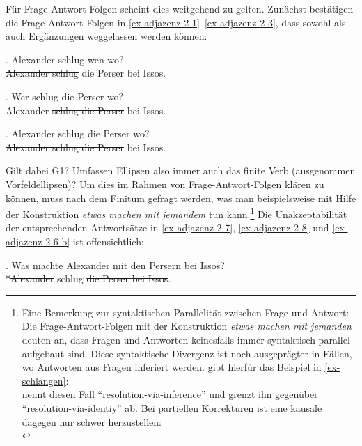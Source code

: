 Für Frage-Antwort-Folgen scheint dies weitgehend zu gelten. Zunächst bestätigen die Fra\-ge-Antwort-Folgen in \ref{ex-adjazenz-2-1}--\ref{ex-adjazenz-2-3}, dass sowohl  als auch Ergänzungen weggelassen werden können: 

\ex. \label{ex-adjazenz-2-1} Alexander schlug wen wo? \\
\sout{Alexander schlug} die Perser bei Issos.

\ex. \label{ex-adjazenz-2-2} Wer schlug die Perser wo? \\
 Alexander \sout{schlug die Perser} bei Issos.

\ex. \label{ex-adjazenz-2-3} Alexander schlug die Perser wo? \\
 \sout{Alexander schlug die Perser} bei Issos.

Gilt dabei G1? Umfassen Ellipsen also immer auch das finite Verb (ausgenommen Vorfeldellipsen)? Um dies im Rahmen von Frage-Antwort-Folgen klären zu können, muss nach dem Finitum gefragt werden, was man beispielsweise mit Hilfe der Konstruktion {\it etwas machen mit jemandem} tun kann.\footnote{Eine Bemerkung zur syntaktischen Parallelität zwischen Frage und Antwort: Die Frage-Antwort-Folgen mit der Konstruktion {\it etwas machen mit jemanden} deuten an, dass Fragen und Antworten keinesfalls immer syntaktisch parallel aufgebaut sind. Diese syntaktische Divergenz ist noch ausgeprägter in Fällen, wo Antworten aus Fragen inferiert werden. \cite{Schlangen:03} gibt hierfür das Beispiel in \ref{ex-schlangen}:\\
\cite{Schlangen:03} nennt diesen Fall "`resolution-via-inference"' und grenzt ihn gegenüber "`resolution-via-identiy"' ab. Bei partiellen Korrekturen ist eine kausale  dagegen nur schwer herzustellen:\\ 
} Die Unakzeptabilität der entsprechenden Antwortsätze in \ref{ex-adjazenz-2-7}, \ref{ex-adjazenz-2-8} und \ref{ex-adjazenz-2-6-b} ist offensichtlich:   

\ex. \label{ex-adjazenz-2-7} Was machte Alexander mit den Persern bei Issos? \\
*\sout{Alexander} schlug \sout{die Perser bei Issos}. 

